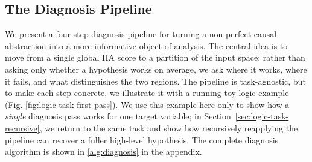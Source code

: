 \subsection{The Diagnosis Pipeline}
\label{subsec:diagnosis-pipeline}

We present a four-step diagnosis pipeline for turning a non-perfect causal abstraction into a more informative object of analysis. The central idea is to move from a single global IIA score to a partition of the input space: rather than asking only whether a hypothesis works on average, we ask where it works, where it fails, and what distinguishes the two regions. The pipeline is task-agnostic, but to make each step concrete, we illustrate it with a running toy logic example (Fig. \ref{fig:logic-task-first-pass}). We use this example here only to show how a \emph{single} diagnosis pass works for one target variable; in Section~\ref{sec:logic-task-recursive}, we return to the same task and show how recursively reapplying the pipeline can recover a fuller high-level hypothesis. The complete diagnosis algorithm is shown in \cref{alg:diagnosis} in the appendix. 


